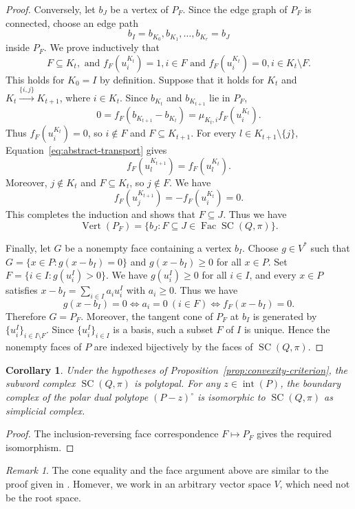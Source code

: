 \documentclass[11pt,a4paper]{article}
\newtheorem{corollary}[theorem]{Corollary}
\theoremstyle{definition}
\theoremstyle{remark}
\newtheorem{remark}[theorem]{Remark}
\newcommand{\SC}{\operatorname{SC}}
\newcommand{\Fac}{\operatorname{Fac}}
\newcommand{\Vertices}{\operatorname{Vert}}
\numberwithin{equation}{section}
\begin{document}
\begin{proof}
Conversely, let $b_J$ be a vertex of $P_F$. Since the edge
graph of $P_F$ is connected, choose an edge path
\[
b_I=b_{K_0},b_{K_1},\ldots,b_{K_r}=b_J
\]
inside $P_F$. We prove inductively that
\[
F\subseteq K_t,\text{ and } f_F(u_i^{K_t})=1, i\in F \text{ and } f_F(u_i^{K_t})=0, i\in K_t\setminus F.
\]
This holds for $K_0=I$ by definition. Suppose that it holds for
$K_t$ and $K_t\overset{\{i,j\}}{\longrightarrow}K_{t+1}$, where $i\in K_t$.
Since $b_{K_t}$ and $b_{K_{t+1}}$ lie in $P_F$,
\[
0=f_F(b_{K_{t+1}}-b_{K_t})=\mu_{K_t,i}f_F(u_i^{K_t}).
\]
Thus $f_F(u_i^{K_t})=0$, so $i\notin F$ and $F\subseteq K_{t+1}$.
For every $l\in K_{t+1}\setminus \{j\}$, Equation~\ref{eq:abstract-transport} gives
\[
f_F(u_l^{K_{t+1}})
=f_F(u_l^{K_t}).
\]
Moreover, $j\notin K_t$ and $F\subseteq K_t$, so $j\notin F$. We have
\[
f_F(u_j^{K_{t+1}})
=-f_F(u_i^{K_t})=0.
\]
This completes the induction and shows that $F\subseteq J$. Thus we have
\[
\Vertices(P_F)
=\{b_J:F\subseteq J\in\Fac\SC(Q,\pi)\}.
\]

Finally, let $G$ be a nonempty face containing a vertex $b_I$. Choose $g\in V^*$ such that $G=\{x\in P:g(x-b_I)=0\}$ and $g(x-b_I)\geq0 $ for all $x\in P$. Set $F=\{i\in I:g(u_i^I)>0\}$. We have $g(u_i^I)\geq0$ for all $i\in I$, and every $x\in P$ satisfies
$x-b_I=\sum_{i\in I}a_i u_i^I$ with $a_i\geq0$. Thus we have
\[
g(x-b_I)=0 \iff a_i=0\ (i\in F) \iff f_F(x-b_I)=0.
\]
Therefore $G=P_F$. Moreover, the tangent cone of $P_F$ at $b_I$
is generated by $\{u_i^I\}_{i\in I\setminus F}$.
Since $\{u_i^I\}_{i\in I}$ is a basis, such a subset $F$ of $I$ is unique. Hence the nonempty faces of $P$ are indexed bijectively by the faces of $\SC(Q,\pi)$.
\end{proof}

\begin{corollary}\label{cor:polytopal}
Under the hypotheses of Proposition~\ref{prop:convexity-criterion},
the subword complex $\SC(Q,\pi)$ is polytopal. For any $z\in\operatorname{int}(P)$, the boundary complex of the polar dual polytope $(P-z)^\circ$ is isomorphic to $\SC(Q,\pi)$ as simplicial complex.
\end{corollary}

\begin{proof}
The inclusion-reversing face correspondence $F\mapsto P_F$ gives the required isomorphism.
\end{proof}

\begin{remark}
    The cone equality and the face argument above are similar to the proof given in \cite[Theorem~4.4 and Proposition~4.6]{JS}. Homever, we work in an arbitrary vector space $V$, which need not be the root space. 
\end{remark}
\end{document}
